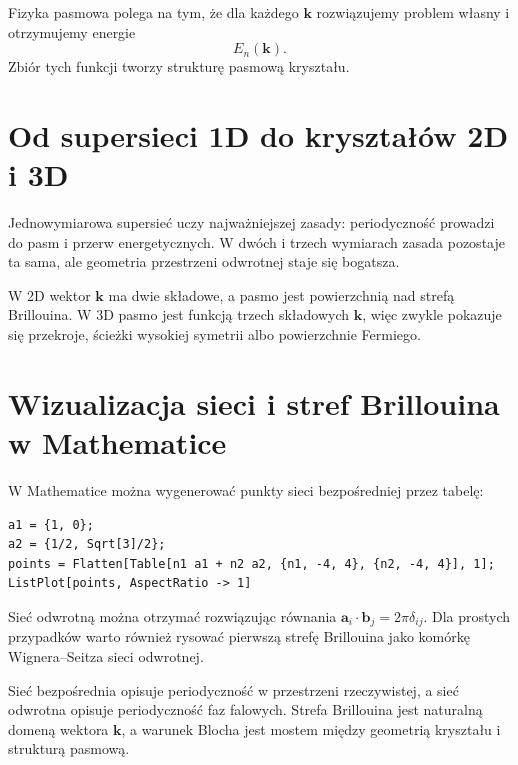 Fizyka pasmowa polega na tym, że dla każdego \(\mathbf{k}\) rozwiązujemy problem własny i otrzymujemy energie
\begin{equation}
    E_n(\mathbf{k}).
\end{equation}
Zbiór tych funkcji tworzy strukturę pasmową kryształu.

\section{Od supersieci 1D do kryształów 2D i 3D}

Jednowymiarowa supersieć uczy najważniejszej zasady: periodyczność prowadzi do pasm i przerw energetycznych. W dwóch i trzech wymiarach zasada pozostaje ta sama, ale geometria przestrzeni odwrotnej staje się bogatsza.

W 2D wektor \(\mathbf{k}\) ma dwie składowe, a pasmo jest powierzchnią nad strefą Brillouina. W 3D pasmo jest funkcją trzech składowych \(\mathbf{k}\), więc zwykle pokazuje się przekroje, ścieżki wysokiej symetrii albo powierzchnie Fermiego.

\section{Wizualizacja sieci i stref Brillouina w Mathematice}

W Mathematice można wygenerować punkty sieci bezpośredniej przez tabelę:
\begin{verbatim}
a1 = {1, 0};
a2 = {1/2, Sqrt[3]/2};
points = Flatten[Table[n1 a1 + n2 a2, {n1, -4, 4}, {n2, -4, 4}], 1];
ListPlot[points, AspectRatio -> 1]
\end{verbatim}
Sieć odwrotną można otrzymać rozwiązując równania \(\mathbf{a}_i\cdot\mathbf{b}_j=2\pi\delta_{ij}\). Dla prostych przypadków warto również rysować pierwszą strefę Brillouina jako komórkę Wignera--Seitza sieci odwrotnej.

\begin{summarybox}
Sieć bezpośrednia opisuje periodyczność w przestrzeni rzeczywistej, a sieć odwrotna opisuje periodyczność faz falowych. Strefa Brillouina jest naturalną domeną wektora \(\mathbf{k}\), a warunek Blocha jest mostem między geometrią kryształu i strukturą pasmową.
\end{summarybox}
